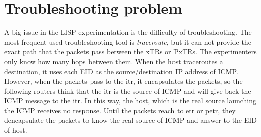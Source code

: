 \section{Troubleshooting problem}
\label{sec:troubleshooting}
A big issue in the LISP experimentation is the difficulty of troubleshooting. The most frequent used troubleshooting tool is \emph{traceroute}, but it can not provide the exact path that the packets pass between the xTRs or PxTRs. The experimenters only know how many hops between them. When the host traceroutes a destination, it uses each EID as the source/destination IP address of ICMP. However, when the packets pass to the \acrshort{itr}, it encapsulates the packets, so the following routers think that the \acrshort{itr} is the source of ICMP and will give back the ICMP message to the \acrshort{itr}. In this way, the host, which is the real source launching the ICMP receives no response. Until the packets reach to \acrshort{etr} or \acrshort{petr}, they dencapsulate the packets to know the real source of ICMP and answer to the EID of host.

